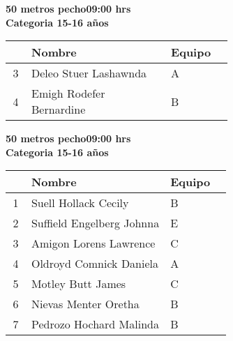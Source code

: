 \begin{minipage}{0.95\linewidth}\vspace{0.5cm} 
\begin{flushleft}
\textbf{
\hspace{-0.15cm}50 metros pecho\hspace{1.5cm}09:00 hrs \\Categoria 15-16 años}\vspace{-0.2cm} 
\end{flushleft}
\begin{tabular}{cp{0.63\linewidth}l}
\hline
& \textbf{Nombre} & \textbf{Equipo} \\ \hline
3 & Deleo Stuer Lashawnda & A \\ 
4 & Emigh Rodefer Bernardine & B \\ 
\end{tabular}
\end{minipage}
\begin{minipage}{0.95\linewidth}\vspace{0.5cm} 
\begin{flushleft}
\textbf{
\hspace{-0.15cm}50 metros pecho\hspace{1.5cm}09:00 hrs \\Categoria 15-16 años}\vspace{-0.2cm} 
\end{flushleft}
\begin{tabular}{cp{0.63\linewidth}l}
\hline
& \textbf{Nombre} & \textbf{Equipo} \\ \hline
1 & Suell Hollack Cecily & B \\ 
2 & Suffield Engelberg Johnna & E \\ 
3 & Amigon Lorens Lawrence & C \\ 
4 & Oldroyd Comnick Daniela & A \\ 
5 & Motley Butt James & C \\ 
6 & Nievas Menter Oretha & B \\ 
7 & Pedrozo Hochard Malinda & B \\ 
\end{tabular}
\end{minipage}
